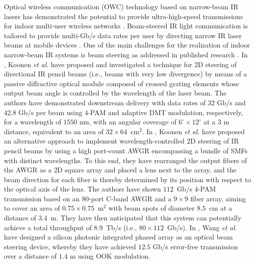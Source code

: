 \documentclass[lettersize,journal]{IEEEtran}
\newcounter{phase}[algorithm]
\begin{document}
Optical wireless communication (OWC) technology based on narrow-beam \ac{IR} lasers has demonstrated the potential to provide ultra-high-speed transmissions for indoor multi-user wireless networks \cite{Koonen2018OWC,TKoonen2020ultra,TKoonen2018high,KWang2018,KWang2011high}. Beam-steered \ac{IR} light communication is tailored to provide multi-Gb/s data rates per user by directing narrow \ac{IR} laser beams at mobile devices \cite{Koonen2018OWC,YHong2021, RSingh2020}. One of the main challenges for the realization of indoor narrow-beam \ac{IR} systems is beam steering as addressed in published research \cite{TKoonen2016ultra,TKoonen2018high,KWang2018}. In \cite{TKoonen2016ultra}, Koonen \textit{et al.} have proposed and investigated a technique for \ac{2D} steering of directional \ac{IR} pencil beams (i.e., beams with very low divergence) by means of a passive diffractive optical module composed of crossed grating elements whose output beam angle is controlled by the wavelength of the laser beam. The authors have demonstrated downstream delivery with data rates of $32$ Gb/s and $42.8$ Gb/s per beam using $4$-\ac{PAM} and adaptive \ac{DMT} modulation, respectively, for a wavelength of $1550$ nm, with an angular coverage of $6^\circ\times12^\circ$ at a $3$ m distance, equivalent to an area of $32\times64$~cm$^2$. In \cite{TKoonen2018high}, Koonen \textit{et al.} have proposed an alternative approach to implement wavelength-controlled \ac{2D} steering of \ac{IR} pencil beams by using a high port-count \ac{AWGR} encompassing a bundle of \acp{SMF} with distinct wavelengths. To this end, they have rearranged the output fibers of the \ac{AWGR} as a \ac{2D} square array and placed a lens next to the array, and the beam direction for each fiber is thereby determined by its position with respect to the optical axis of the lens. The authors have shown $112$~Gb/s $4$-\ac{PAM} transmission based on an $80$-port C-band \ac{AWGR} and a $9\times9$ fiber array, aiming to cover an area of $0.75\times0.75$~m$^2$ with beam spots of diameter $8.5$~cm at a distance of $3.4$~m. They have then anticipated that this system can potentially achieve a total throughput of $8.9$~Tb/s (i.e., $80\times112$~Gb/s). In \cite{KWang2018}, Wang \textit{et al.} have designed a silicon photonic integrated phased array as an optical beam steering device, whereby they have achieved $12.5$ Gb/s error-free transmission over a distance of $1.4$ m using \ac{OOK} modulation.
\end{document}
